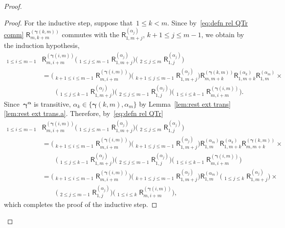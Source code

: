 \documentclass[12pt, reqno]{amsart}
\newcommand{\sfR}{\mathsf{R}}
\theoremstyle{definition}
\newcommand{\dscprod}{\mathop{\overleftarrow{\prod}}}
\numberwithin{equation}{section}
\begin{document}
\begin{proof}
\begin{proof}
For the inductive step, suppose that~$1\le k<m$.
Since by~\eqref{eq:defn rel QTr comm} $\sfR_{m,k+m}^{(\boldsymbol\gamma(k,m))}$
commutes with the $\sfR_{1,m+j}^{(\alpha_j)}$, $k+1\le j\le m-1$, we obtain by the induction hypothesis,
\begin{align*}
\dscprod_{1\le i\le m-1}&
\sfR_{m,i+m}^{(\boldsymbol\gamma(i,m))}\Big(\dscprod_{1\le j\le m-1}
\sfR_{1,m+j}^{(\alpha_j)}\Big)\Big(\dscprod_{2\le j\le m}
\sfR_{1,j}^{(\alpha_j)}\Big)\\
&=\Big(\dscprod_{k+1\le i\le m-1}
\sfR_{m,i+m}^{(\boldsymbol\gamma(i,m))}\Big)
\Big(\dscprod_{k+1\le j\le m-1}
\sfR_{1,m+j}^{(\alpha_j)}\Big)\sfR_{m,m+k}^{(\boldsymbol\gamma(k,m))} \sfR_{1,m+k}^{(\alpha_k)}\sfR_{1,m}^{(\alpha_m)}
\times\\
&\qquad \Big(\dscprod_{1\le j\le k-1}
\sfR_{1,m+j}^{(\alpha_j)}\Big)\Big(\dscprod_{2\le j\le m-1}
\sfR_{1,j}^{(\alpha_j)}\Big)\Big(\dscprod_{1\le i\le k-1}
\sfR_{m,i+m}^{(\boldsymbol\gamma(i,m))}\Big).
\end{align*}
Since~$\boldsymbol\gamma^{\boldsymbol\alpha}$ is transitive, $\alpha_k\in \{\boldsymbol\gamma(k,m),\alpha_m\}$ by Lemma~\ref{lem:rest ext trans}\ref{lem:rest ext trans.a}. Therefore, by~\eqref{eq:defn rel QTr}
\begin{align*}
\dscprod_{1\le i\le m-1}&
\sfR_{m,i+m}^{(\boldsymbol\gamma(i,m))}\Big(\dscprod_{1\le j\le m-1}
\sfR_{1,m+j}^{(\alpha_j)}\Big)\Big(\dscprod_{2\le j\le m}
\sfR_{1,j}^{(\alpha_j)}\Big)\\
&=\Big(\dscprod_{k+1\le i\le m-1}
\sfR_{m,i+m}^{(\boldsymbol\gamma(i,m))}\Big)
\Big(\dscprod_{k+1\le j\le m-1}
\sfR_{1,m+j}^{(\alpha_j)}\Big) \sfR_{1,m}^{(\alpha_m)}\sfR_{1,m+k}^{(\alpha_k)}\sfR_{m,m+k}^{(\boldsymbol\gamma(k,m))}
\times\\
&\qquad \Big(\dscprod_{1\le j\le k-1}
\sfR_{1,m+j}^{(\alpha_j)}\Big)\Big(\dscprod_{2\le j\le m-1}
\sfR_{1,j}^{(\alpha_j)}\Big)\Big(\dscprod_{1\le i\le k-1}
\sfR_{m,i+m}^{(\boldsymbol\gamma(i,m))}\Big)\\
&=\Big(\dscprod_{k+1\le i\le m-1}
\sfR_{m,i+m}^{(\boldsymbol\gamma(i,m))}\Big)
\Big(\dscprod_{k+1\le j\le m-1}
\sfR_{1,m+j}^{(\alpha_j)}\Big) \sfR_{1,m}^{(\alpha_m)}
\Big(\dscprod_{1\le j\le k}
\sfR_{1,m+j}^{(\alpha_j)}\Big)\times\\
&\qquad \Big(\dscprod_{2\le j\le m-1}
\sfR_{1,j}^{(\alpha_j)}\Big)\Big(\dscprod_{1\le i\le k}
\sfR_{m,i+m}^{(\boldsymbol\gamma(i,m))}\Big),
\end{align*}
which completes the proof of the inductive step.
\end{proof}

\end{proof}
\end{document}
